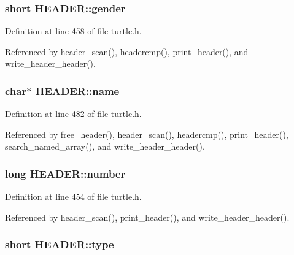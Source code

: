 \hypertarget{struct_h_e_a_d_e_r_a11fc67d4322c2d06729d3290f60b0a37}{
\subsubsection[{gender}]{\setlength{\rightskip}{0pt plus 5cm}short H\-E\-A\-D\-E\-R\-::gender}}\label{struct_h_e_a_d_e_r_a11fc67d4322c2d06729d3290f60b0a37}


Definition at line 458 of file turtle.\-h.



Referenced by header\-\_\-scan(), headercmp(), print\-\_\-header(), and write\-\_\-header\-\_\-header().

\hypertarget{struct_h_e_a_d_e_r_a65f660d696f9e81d8a551199092477d8}{
\subsubsection[{name}]{\setlength{\rightskip}{0pt plus 5cm}char$\ast$ H\-E\-A\-D\-E\-R\-::name}}\label{struct_h_e_a_d_e_r_a65f660d696f9e81d8a551199092477d8}


Definition at line 482 of file turtle.\-h.



Referenced by free\-\_\-header(), header\-\_\-scan(), headercmp(), print\-\_\-header(), search\-\_\-named\-\_\-array(), and write\-\_\-header\-\_\-header().

\hypertarget{struct_h_e_a_d_e_r_a8cb1e759560a515cbd3abd9b085564e8}{
\subsubsection[{number}]{\setlength{\rightskip}{0pt plus 5cm}long H\-E\-A\-D\-E\-R\-::number}}\label{struct_h_e_a_d_e_r_a8cb1e759560a515cbd3abd9b085564e8}


Definition at line 454 of file turtle.\-h.



Referenced by header\-\_\-scan(), print\-\_\-header(), and write\-\_\-header\-\_\-header().

\hypertarget{struct_h_e_a_d_e_r_aa49a7ecb59503c1200ce519378258384}{
\subsubsection[{type}]{\setlength{\rightskip}{0pt plus 5cm}short H\-E\-A\-D\-E\-R\-::type}}\label{struct_h_e_a_d_e_r_aa49a7ecb59503c1200ce519378258384}


